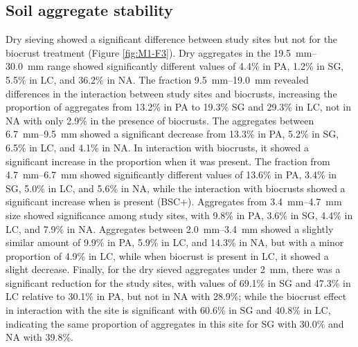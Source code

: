 \subsection{Soil aggregate stability}

Dry sieving showed a significant difference between study sites but not for the biocrust treatment (Figure \ref{fig:M1-F3}). Dry aggregates in the \SIrange[range-phrase=--,range-units=single]{19.5}{30.0}{\milli\meter} range showed significantly different values of 4.4\% in PA, 1.2\% in SG, 5.5\% in LC, and 36.2\% in NA. The fraction \SIrange[range-phrase=--,range-units=single]{9.5}{19.0}{\milli\meter} revealed differences in the interaction between study sites and biocrusts, increasing the proportion of aggregates from 13.2\% in PA to 19.3\% SG and 29.3\% in LC, not in NA with only 2.9\% in the presence of biocrusts. The aggregates between \SIrange[range-phrase=--,range-units=single]{6.7}{9.5}{\milli\meter} showed a significant decrease from 13.3\% in PA, 5.2\% in SG, 6.5\% in LC, and 4.1\% in NA. In interaction with biocrusts, it showed a significant increase in the proportion when it was present. The fraction from \SIrange[range-phrase=--,range-units=single]{4.7}{6.7}{\milli\meter} showed significantly different values of 13.6\% in PA, 3.4\% in SG, 5.0\% in LC, and 5.6\% in NA, while the interaction with biocrusts showed a significant increase when is present (BSC+). Aggregates from \SIrange[range-phrase=--,range-units=single]{3.4}{4.7}{\milli\meter} size showed significance among study sites, with 9.8\% in PA, 3.6\% in SG, 4.4\% in LC, and 7.9\% in NA. Aggregates between \SIrange[range-phrase=--,range-units=single]{2.0}{3.4}{\milli\meter} showed a slightly similar amount of 9.9\% in PA, 5.9\% in LC, and 14.3\% in NA, but with a minor proportion of 4.9\% in LC, while when biocrust is present in LC, it showed a slight decrease. Finally, for the dry sieved aggregates under \SI{2}{\milli\meter}, there was a significant reduction for the study sites, with values of 69.1\% in SG and 47.3\% in LC relative to 30.1\% in PA, but not in NA with 28.9\%; while the biocrust effect in interaction with the site is significant with 60.6\% in SG and 40.8\% in LC, indicating the same proportion of aggregates in this site for SG with 30.0\% and NA with 39.8\%.

